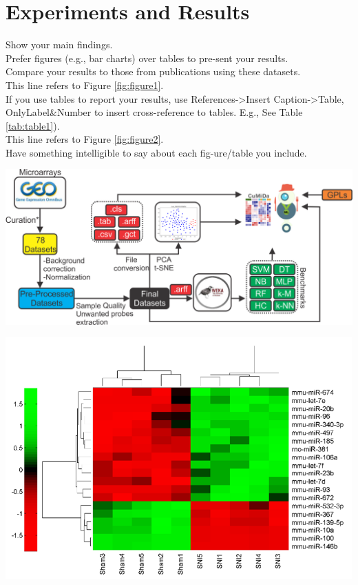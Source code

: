 
\section{Experiments and Results}

Show your main findings.\\
Prefer figures (e.g., bar charts) over tables to pre-sent your results.\\
Compare your results to those from publications using these datasets. \\
This line refers to Figure \ref{fig:figure1}.\\
If you use tables to report your results, use References->Insert Caption->Table,
OnlyLabel\&Number to insert cross-reference to tables. E.g., See Table \ref{tab:table1}). \\
This line refers to Figure \ref{fig:figure2}.\\
Have something intelligible to say about each fig-ure/table you include.

    {
        \includegraphics[width=\columnwidth]{./images/cumida.png}
        \label{fig:figure1}
    }

    {
        \includegraphics[width=\columnwidth]{./images/figure1.png}
        \label{fig:figure2}
    }


